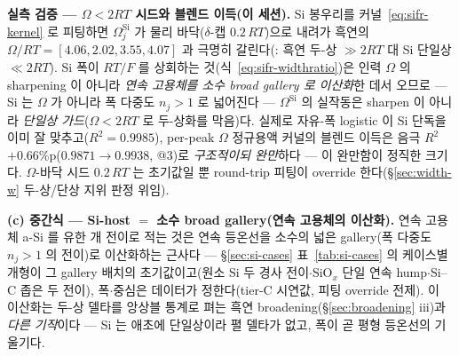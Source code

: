 \begin{verifybox}
\textbf{실측 검증 --- $\Omega<2RT$ 시드와 블렌드 이득(이 세션).} Si 봉우리를 커널~\eqref{eq:sifr-kernel} 로
피팅하면 $\Omega^\mathrm{Si}_j$ 가 물리 바닥($\delta$-캡 $0.2\,RT$)으로 내려가 흑연의
$\Omega/RT\!=\![4.06,2.02,3.55,4.07]$ 과 극명히 갈린다(: 흑연 두-상 $\gg2RT$
대 Si 단일상 $\ll2RT$). Si 폭이 $RT/F$ 를 상회하는 것(식~\eqref{eq:sifr-widthratio})은 인력 $\Omega$ 의
sharpening 이 아니라 \emph{연속 고용체를 소수 broad gallery 로 이산화}한 데서 오므로 --- Si 는 $\Omega$ 가
아니라 폭 다중도 $n_j\!>\!1$ 로 넓어진다 --- $\Omega^\mathrm{Si}$ 의 실작동은 sharpen 이 아니라 \emph{단일상
가드}($\Omega<2RT$ 로 두-상화를 막음)다. 실제로 자유-폭 logistic 이 Si 단독을 이미 잘 맞추고($R^2\!=\!0.9985$),
per-peak $\Omega$ 정규용액 커널의 블렌드 이득은 음극 $R^2$ $+0.66$\%p($0.9871\!\to\!0.9938$,
 @3)로 \emph{구조적이되 완만}하다 --- 이 완만함이 정직한 크기다. $\Omega$-바닥 시드
$0.2\,RT$ 는 초기값일 뿐 round-trip 피팅이 override 한다(\S\ref{sec:width-w} 두-상/단상 지위 판정 위임).
\end{verifybox}

\textbf{(c) 중간식 --- Si-host $=$ 소수 broad gallery(연속 고용체의 이산화).}
연속 고용체 a-Si 를 유한 개 전이로 적는 것은 연속 등온선을 소수의 넓은 gallery(폭 다중도 $n_j\!>\!1$ 의
전이)로 이산화하는 근사다 --- \S\ref{sec:si-cases} 표~\ref{tab:si-cases} 의 케이스별 개형이 그
gallery 배치의 초기값이고(원소 Si 두 경사 전이$\cdot$SiO$_x$ 단일 연속 hump$\cdot$Si--C 좁은 두 전이),
폭$\cdot$중심은 데이터가 정한다(tier-C 시연값, 피팅 override 전제). 이 이산화는 두-상 델타를 앙상블
통계로 펴는 흑연 broadening(\S\ref{sec:broadening} iii)과 \emph{다른 기작}이다 --- Si 는 애초에 단일상이라
펼 델타가 없고, 폭이 곧 평형 등온선의 기울기다.

